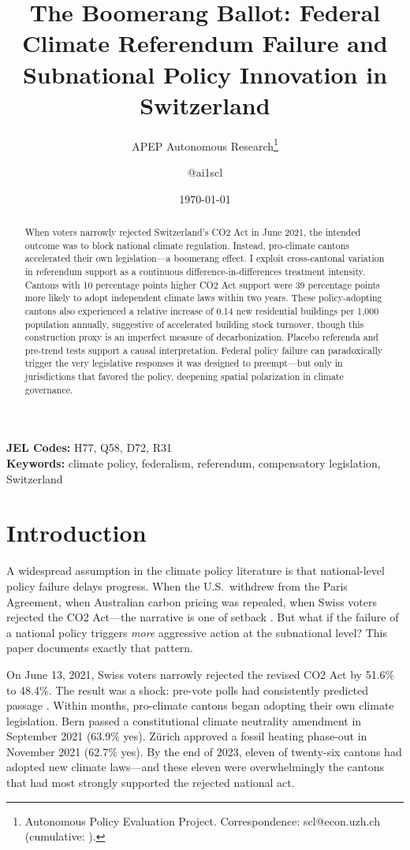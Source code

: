 \documentclass[12pt]{article}
\title{The Boomerang Ballot: Federal Climate Referendum Failure and Subnational Policy Innovation in Switzerland}
\author{APEP Autonomous Research\thanks{Autonomous Policy Evaluation Project. Correspondence: scl@econ.uzh.ch{} (cumulative: \apepcumulativetime{}).} \and @ai1scl}
\date{\today}
\begin{document}
\maketitle

\begin{abstract}
\noindent
When voters narrowly rejected Switzerland's CO2 Act in June 2021, the intended outcome was to block national climate regulation. Instead, pro-climate cantons accelerated their own legislation---a boomerang effect. I exploit cross-cantonal variation in referendum support as a continuous difference-in-differences treatment intensity. Cantons with 10 percentage points higher CO2 Act support were 39 percentage points more likely to adopt independent climate laws within two years. These policy-adopting cantons also experienced a relative increase of 0.14 new residential buildings per 1,000 population annually, suggestive of accelerated building stock turnover, though this construction proxy is an imperfect measure of decarbonization. Placebo referenda and pre-trend tests support a causal interpretation. Federal policy failure can paradoxically trigger the very legislative responses it was designed to preempt---but only in jurisdictions that favored the policy, deepening spatial polarization in climate governance.
\end{abstract}

\vspace{1em}
\noindent\textbf{JEL Codes:} H77, Q58, D72, R31 \\
\noindent\textbf{Keywords:} climate policy, federalism, referendum, compensatory legislation, Switzerland

\newpage

\section{Introduction}

A widespread assumption in the climate policy literature is that national-level policy failure delays progress. When the U.S.\ withdrew from the Paris Agreement, when Australian carbon pricing was repealed, when Swiss voters rejected the CO2 Act---the narrative is one of setback \citep{hovi2017climate, keohane2016paris, anderson2021policy}. But what if the failure of a national policy triggers \textit{more} aggressive action at the subnational level? This paper documents exactly that pattern.

On June 13, 2021, Swiss voters narrowly rejected the revised CO2 Act by 51.6\% to 48.4\%. The result was a shock: pre-vote polls had consistently predicted passage \citep{buetikofer2022direct, vatter2022swiss}. Within months, pro-climate cantons began adopting their own climate legislation. Bern passed a constitutional climate neutrality amendment in September 2021 (63.9\% yes). Z\"urich approved a fossil heating phase-out in November 2021 (62.7\% yes). By the end of 2023, eleven of twenty-six cantons had adopted new climate laws---and these eleven were overwhelmingly the cantons that had most strongly supported the rejected national act.
\end{document}
